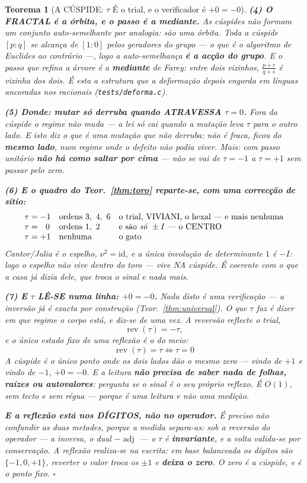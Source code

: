 \documentclass[11pt,a4paper]{article}
\newtheorem{teorema}{Teorema}
\newcommand{\code}[1]{\texttt{\small #1}}
\begin{document}
\begin{teorema}[A CÚSPIDE: $\tau$ É o trial, e o verificador é $+0=-0$]
\textbf{(4) O FRACTAL é a órbita, e o passo é a mediante.} As cúspides não formam um
conjunto auto-semelhante por analogia: são \emph{uma} órbita. Toda a cúspide $[p:q]$ se
alcança de $[1:0]$ pelos geradores do grupo --- o que é o algoritmo de Euclides ao contrário
---, logo a auto-semelhança \textbf{é a acção do grupo}. E o passo que refina a árvore é a
\textbf{mediante} de Farey: entre dois vizinhos, $\frac{p+r}{q+s}$ é vizinha dos dois. É
esta a estrutura que a deformação depois engorda em línguas ancoradas nos racionais
(\code{tests/deforma.c}).

\textbf{(5) Donde: mutar só derruba quando ATRAVESSA $\tau=0$.} Fora da cúspide o regime
não muda --- a lei só cai quando a mutação leva $\tau$ para o outro lado. \emph{E isto diz o
que é uma mutação que não derruba}: não é fraca, ficou do \textbf{mesmo lado}, num regime
onde o defeito não podia viver. Mais: com passo unitário \textbf{não há como saltar por
cima} --- não se vai de $\tau=-1$ a $\tau=+1$ sem passar pelo zero.

\textbf{(6) E o quadro do Teor.~\ref{thm:toro} reparte-se, com uma correcção de sítio:}
\[
\begin{array}{lll}
\tau=-1 & \text{ordens }3,\ 4,\ 6 & \text{o trial, VIVIANI, o hexal --- e mais nenhuma}\\
\tau=\ \ 0 & \text{ordens }1,\ 2 & \text{e são \emph{só} }\pm I\text{ --- o CENTRO}\\
\tau=+1 & \text{nenhuma} & \text{o gato}
\end{array}
\]
Cantor/Julia é o espelho, $\nu^{2}=\mathrm{id}$, e a única involução de determinante $1$ é
$-I$: \emph{logo o espelho não vive dentro do toro --- vive NA cúspide}. É coerente com o
que a casa já dizia dele, que troca o sinal e nada mais.

\textbf{(7) E $\tau$ LÊ-SE numa linha: $+0=-0$.} Nada disto é uma verificação --- a
inversão já é exacta por construção (Teor.~\ref{thm:universal}). O que $\tau$ faz é
\emph{dizer em que regime o corpo está}, e diz-se de uma vez. A reversão reflecte o trial,
\[
\operatorname{rev}(\tau)=-\tau,
\]
e o único estado fixo de uma reflexão é o do meio:
\[
\boxed{\;\operatorname{rev}(\tau)=\tau\iff\tau=0\;}
\]
\emph{A cúspide é o único ponto onde os dois lados dão o mesmo zero} --- vindo de $+1$ e
vindo de $-1$, $+0=-0$. E a leitura \textbf{não precisa de saber nada de folhas, raízes ou
autovalores}: pergunta se o sinal é o seu próprio reflexo. É $O(1)$, sem tecto e sem régua
--- \emph{porque é uma leitura e não uma medição}.

\textbf{E a reflexão está nos DÍGITOS, não no operador.} É preciso não confundir as duas
metades, porque a medida separa-as: sob a reversão do \emph{operador} --- a inversa, o dual
$-\operatorname{adj}$ --- o $\tau$ é \textbf{invariante}, e a volta valida-se por
conservação. A reflexão realiza-se na \emph{escrita}: em base balanceada os dígitos são
$\{-1,0,+1\}$, reverter o valor troca os $\pm1$ e \textbf{deixa o zero}. O zero é a cúspide,
e é o ponto fixo. $\square$
\end{teorema}
\end{document}
